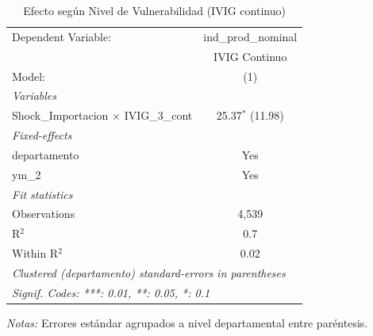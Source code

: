 \documentclass[12pt]{article}
\begin{document}
\setcounter{table}{9}
\begin{table}[htbp]
\centering
\begin{threeparttable}

   \caption{Efecto según Nivel de Vulnerabilidad (IVIG continuo)}
   \centering
   \small
   \begin{tabular}{lc}
      \tabularnewline \midrule \midrule
      Dependent Variable:                           & ind\_prod\_nominal\\    
                                                    & IVIG Continuo \\   
      Model:                                        & (1)\\  
      \midrule
      \emph{Variables}\\
      Shock\_Importacion $\times$ IVIG\_3\_cont     & 25.37$^{*}$ (11.98)\\   
      \midrule
      \emph{Fixed-effects}\\
      departamento                                  & Yes\\  
      ym\_2                                         & Yes\\  
      \midrule
      \emph{Fit statistics}\\
      Observations                                  & 4,539\\  
      R$^2$                                         & 0.7\\  
      Within R$^2$                                  & 0.02\\  
      \midrule \midrule
      \multicolumn{2}{l}{\emph{Clustered (departamento) standard-errors in parentheses}}\\
      \multicolumn{2}{l}{\emph{Signif. Codes: ***: 0.01, **: 0.05, *: 0.1}}\\
   \end{tabular}


\begin{tablenotes}
\footnotesize
\item \textit{Notas:} Errores estándar agrupados a nivel departamental entre paréntesis.
\end{tablenotes}
\end{threeparttable}
\end{table}
\end{document}
